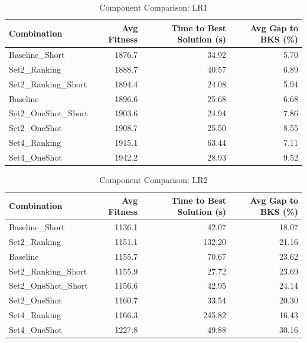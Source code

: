 \documentclass{article}
\begin{document}
\begin{table}[htbp]
\centering
\caption{Component Comparison: LR1}
\label{tab:comparison_lr1}
\begin{tabular}{lrrr}
\toprule
Combination & Avg Fitness & Time to Best Solution (s) & Avg Gap to BKS (\%) \\
\midrule
Baseline\_Short & 1876.7 & 34.92 & 5.70 \\
Set2\_Ranking & 1888.7 & 40.57 & 6.89 \\
Set2\_Ranking\_Short & 1894.4 & 24.08 & 5.94 \\
Baseline & 1896.6 & 25.68 & 6.68 \\
Set2\_OneShot\_Short & 1903.6 & 24.94 & 7.86 \\
Set2\_OneShot & 1908.7 & 25.50 & 8.55 \\
Set4\_Ranking & 1915.1 & 63.44 & 7.11 \\
Set4\_OneShot & 1942.2 & 28.93 & 9.52 \\
\bottomrule
\end{tabular}
\end{table}

\begin{table}[htbp]
\centering
\caption{Component Comparison: LR2}
\label{tab:comparison_lr2}
\begin{tabular}{lrrr}
\toprule
Combination & Avg Fitness & Time to Best Solution (s) & Avg Gap to BKS (\%) \\
\midrule
Baseline\_Short & 1136.1 & 42.07 & 18.07 \\
Set2\_Ranking & 1151.1 & 132.20 & 21.16 \\
Baseline & 1155.7 & 70.67 & 23.62 \\
Set2\_Ranking\_Short & 1155.9 & 27.72 & 23.69 \\
Set2\_OneShot\_Short & 1156.6 & 42.95 & 24.14 \\
Set2\_OneShot & 1160.7 & 33.54 & 20.30 \\
Set4\_Ranking & 1166.3 & 245.82 & 16.43 \\
Set4\_OneShot & 1227.8 & 49.88 & 30.16 \\
\bottomrule
\end{tabular}
\end{table}
\end{document}
